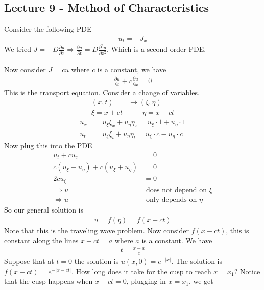 \documentclass[12pt, letterpaper]{article}
\begin{document}
\subsection{Lecture 9 - Method of Characteristics}
Consider the following PDE
\begin{align*}
    u_t = -J_x
\end{align*}
We tried $\displaystyle J = -D \frac{\partial u}{\partial x} \Rightarrow \frac{\partial u}{\partial t} = D \frac{\partial^2 u}{\partial x^2}$.
Which is a second order PDE. \\ \\ Now consider $J =cu$ where $c$ is a constant, we have
\begin{align*}
    \frac{\partial u}{\partial t} + c \frac{\partial u }{\partial x} = 0
\end{align*}
This is the transport equation. Consider a change of variables.
\begin{align*}
    (x,t) &\rightarrow (\xi, \eta) \\ 
    \xi = x + ct &\qquad \eta = x- ct
\end{align*}
\begin{align*}
    u_x &= u_\xi \xi_x + u_\eta \eta_x = u_\xi \cdot 1 + u_\eta \cdot 1 \\
    u_t &= u_\xi \xi_t + u_\eta \eta_t = u_\xi \cdot c - u_\eta \cdot c
\end{align*}
Now plug this into the PDE
\begin{align*}
    u_t + cu_x &= 0 \\
    c\left(u_\xi - u_\eta\right) + c(u_\xi + u_\eta) &= 0 \\
    2cu_\xi &= 0 \\
    \Rightarrow u &\text{ does not depend on } \xi \\
    \Rightarrow u &\text{ only depends on } \eta
\end{align*}
So our general solution is 
\begin{align*}
    u = f(\eta) = f(x-ct)
\end{align*}
Note that this is the traveling wave problem. Now consider $f(x-ct)$, this is 
constant along the lines $x-ct = a$ where $a$ is a constant. We have 
\begin{align*}
    t = \frac{x-a}{c}
\end{align*}
Suppose that at $t = 0$ the solution is $u(x,0) = e^{-|x|}$. The solution 
is $f(x-ct) = e^{-|x-ct|}$. How long does it take for the cusp to reach $x = x_1$? 
Notice that the cusp happens when $x - ct = 0$, plugging in $x = x_1$, we get 
\end{document}

